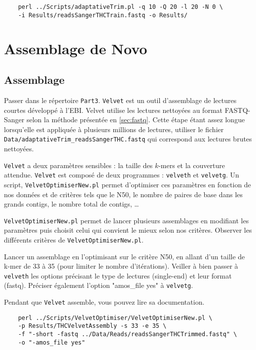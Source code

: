 \documentclass[a4paper,12pt]{article}
\begin{document}
\begin{lstlisting}	
	perl ../Scripts/adaptativeTrim.pl -q 10 -Q 20 -l 20 -N 0 \
	-i Results/readsSangerTHCTrain.fastq -o Results/
\end{lstlisting}


\section{Assemblage de Novo}
\label{sec:assd}
\subsection{Assemblage}
Passer dans le répertoire \verb=Part3=. \verb=Velvet= est un outil d'assemblage de lectures courtes développé à l'EBI. Velvet utilise les lectures nettoyées au format FASTQ-Sanger selon la méthode présentée en \ref{sec:fastq}. Cette étape étant assez longue lorsqu'elle est appliquée à plusieurs millions de lectures, utiliser le fichier \verb=Data/adaptativeTrim_readsSangerTHC.fastq= qui correspond aux lectures brutes nettoyées.

\verb=Velvet= a deux paramètres sensibles : la taille des $k$-mers et la couverture attendue. \verb=Velvet= est composé de deux programmes : \verb=velveth= et \verb=velvetg=.
Un script, \verb=VelvetOptimiserNew.pl= permet d'optimiser ces paramètres en fonction de nos données et de critères tels que le N50, le nombre de paires de base dans les grands contigs, le nombre total de contigs, \ldots

\verb=VelvetOptimiserNew.pl= permet de lancer plusieurs assemblages en modifiant les paramètres puis choisit celui qui convient le mieux selon nos critères.
Observer les différents critères de \verb=VelvetOptimiserNew.pl=.

Lancer un assemblage en l'optimisant sur le critère N50, en allant d'un taille de k-mer de 33 à 35 (pour limiter le nombre d'itérations). Veiller à bien passer à \verb=velveth= les options précisant le type de lectures (single-end) et leur format (fastq). Préciser également l'option "amos\_file yes" à \verb=velvetg=.

Pendant que \verb=Velvet= assemble, vous pouvez lire sa documentation.


\begin{lstlisting}	
	perl ../Scripts/VelvetOptimiser/VelvetOptimiserNew.pl \
	-p Results/THCVelvetAssembly -s 33 -e 35 \
	-f "-short -fastq ../Data/Reads/readsSangerTHCTrimmed.fastq" \
	-o "-amos_file yes"
\end{lstlisting}	
\end{document}
